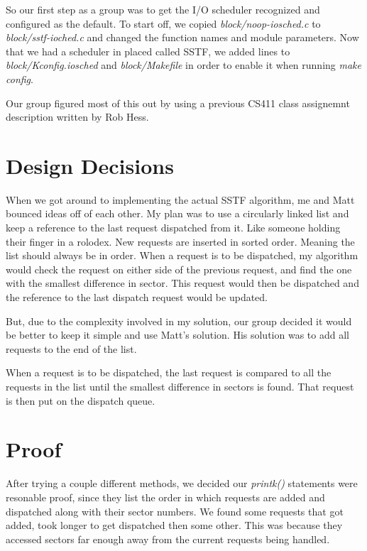 \documentclass[letterpaper,10pt,titlepage]{article}
\begin{document}
So our first step as a group was to get the I/O scheduler recognized and
configured as the default. To start off, we copied
\emph{block/noop-iosched.c} to \emph{block/sstf-ioched.c} and changed
the function names and module parameters. Now that we had a scheduler in
placed called SSTF, we added lines to \emph{block/Kconfig.iosched} and
\emph{block/Makefile} in order to enable it when running \emph{make
config}.

Our group figured most of this out by using a previous CS411 class
assignemnt description written by Rob Hess.

\section*{Design Decisions}

When we got around to implementing the actual SSTF algorithm, me and
Matt bounced ideas off of each other. My plan was to use a circularly
linked list and keep a reference to the last request dispatched from it.
Like someone holding their finger in a rolodex. New requests are
inserted in sorted order. Meaning the list should always be in order.
When a request is to be dispatched, my algorithm would check the
request on either side of the previous request, and find the one with the
smallest difference in sector. This request would then be dispatched and
the reference to the last dispatch request would be updated.

But, due to the complexity involved in my solution, our group decided it
would be better to keep it simple and use Matt's solution. His solution
was to add all requests to the end of the list. 

%

When a request is to be
dispatched, the last request is compared to all the requests in the list
until the smallest difference in sectors is found. That request is then
put on the dispatch queue.

%

\section*{Proof}

After trying a couple different methods, we decided our \emph{printk()}
statements were resonable proof, since they list the order in which
requests are added and dispatched along with their sector numbers. We
found some requests that got added, took longer to get dispatched then
some other. This was because they accessed sectors far enough away from
the current requests being handled.
\end{document}
